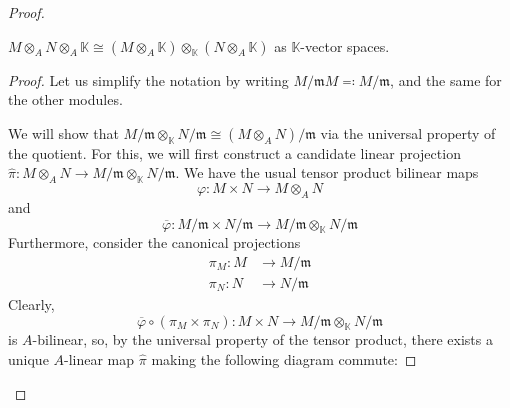 \begin{problem}
\begin{enumerate}[label=(\theproblem.\arabic*),ref=\theproblem.\arabic*]
\begin{sol}
\begin{proof}
                    \begin{claim}
                        $M \otimes_A N \otimes_A \mathbb{K} \cong (M \otimes_A \mathbb{K}) \otimes_{\mathbb{K}} (N \otimes_A \mathbb{K})$ as $\mathbb{K}$-vector spaces.
                            \begin{proof}

                                Let us simplify the notation by writing $M/\mathfrak{m}M \eqqcolon M/\mathfrak{m}$, and the same for the other modules.

                                We will show that $M/\mathfrak{m} \otimes_\mathbb{K} N/\mathfrak{m} \cong (M \otimes_A N)/\mathfrak{m}$ via the universal property of the quotient.
                                For this, we will first construct a candidate linear projection \linebreak
                                ${\hat{\pi}: M \otimes_A N \rightarrow M/\mathfrak{m} \otimes_\mathbb{K} N/\mathfrak{m}}$.
                                We have the usual tensor product bilinear maps
                                \[\varphi: M \times N \rightarrow M \otimes_A N\]
                                and
                                \[\overline{\varphi}: M/\mathfrak{m} \times N/\mathfrak{m} \rightarrow M/\mathfrak{m} \otimes_\mathbb{K} N/\mathfrak{m}\]
                                Furthermore, consider the canonical projections
                                \begin{align*}
                                    \pi_M: M &\rightarrow M/\mathfrak{m}\\
                                    \pi_N: N &\rightarrow N/\mathfrak{m}
                                \end{align*}
                                Clearly,
                                \[\overline{\varphi} \circ (\pi_M \times \pi_N): M \times N \rightarrow M/\mathfrak{m} \otimes_{\mathbb{K}} N/\mathfrak{m}\]
                                is $A$-bilinear, so, by the universal property of the tensor product, there exists a unique $A$-linear map $\hat{\pi}$ making the following diagram commute:


\end{proof}
\end{claim}
\end{proof}
\end{sol}
\end{enumerate}
\end{problem}
